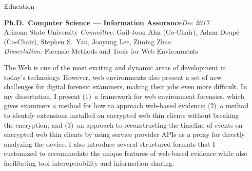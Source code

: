 

\begin{rSection}{Education}

\textbf{Ph.D.\ Computer Science --- Information Assurance}\hfill \emph{Dec 2017}\\
Arizona State University\iftoggle{showGPA}{ | GPA 3.76}{} \hfill %
\iftoggle{fullAddress}{{1151 S Forest Ave \#140, Tempe, AZ 85281}\\}{{Tempe, AZ}\\}
\textit{Committee:} Gail-Joon Ahn (Co-Chair), Adam Doup\'{e} (Co-Chair), Stephen S.\ Yau, Jooyung Lee, Ziming Zhao\\
\textit{Dissertation:} Forensic Methods and Tools for Web Environments
\begin{CVonly}\begin{quoting}

  The Web is one of the most exciting and dynamic areas of development in today's technology. However, web environments
  also present a set of new challenges for digital forensic examiners, making their jobs even more difficult. In my
  dissertation, I present (1)~a framework for web environment forensics, which gives examiners a method for how to
  approach web-based evidence; (2)~a method to identify extensions installed on encrypted web thin clients without
  breaking the encryption; and (3)~an approach to reconstructing the timeline of events on encrypted web thin clients by
  using service provider APIs as a proxy for directly analyzing the device. I also introduce several structured formats
  that I customized to accommodate the unique features of web-based evidence while also facilitating tool
  interoperability and information sharing.

\end{quoting}\end{CVonly}


\end{rSection}
